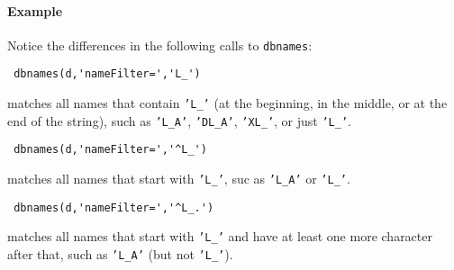  \paragraph{Example}
 
 Notice the differences in the following calls to \texttt{dbnames}:
 
 \begin{verbatim}
 dbnames(d,'nameFilter=','L_')
 \end{verbatim}
 
 matches all names that contain \texttt{'L\_'} (at the beginning, in the
 middle, or at the end of the string), such as \texttt{'L\_A'},
 \texttt{'DL\_A'}, \texttt{'XL\_'}, or just \texttt{'L\_'}.
 
 \begin{verbatim}
 dbnames(d,'nameFilter=','^L_')
 \end{verbatim}
 
 matches all names that start with \texttt{'L\_'}, suc as \texttt{'L\_A'}
 or \texttt{'L\_'}.
 
 \begin{verbatim}
 dbnames(d,'nameFilter=','^L_.')
 \end{verbatim}
 
 matches all names that start with \texttt{'L\_'} and have at least one
 more character after that, such as \texttt{'L\_A'} (but not
 \texttt{'L\_'}).


